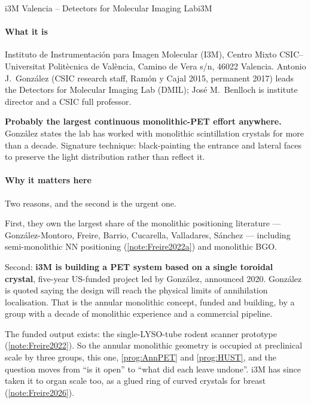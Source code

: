 \begin{programnote}{i3M Valencia -- Detectors for Molecular Imaging Lab}{i3M}
 
\paragraph{What it is}
Instituto de Instrumentación para Imagen Molecular (I3M), Centro Mixto
CSIC--Universitat Politècnica de València, Camino de Vera s/n, 46022 Valencia.
Antonio J.\ González (CSIC research staff, Ramón y Cajal 2015, permanent 2017)
leads the Detectors for Molecular Imaging Lab (DMIL); José M.\ Benlloch is
institute director and a CSIC full professor.
 
\textbf{Probably the largest continuous monolithic-PET effort anywhere.}
González states the lab has worked with monolithic scintillation crystals for
more than a decade. Signature technique: black-painting the entrance and lateral
faces to preserve the light distribution rather than reflect it.
 
\paragraph{Why it matters here}
Two reasons, and the second is the urgent one.
 
First, they own the largest share of the monolithic positioning literature ---
González-Montoro, Freire, Barrio, Cucarella, Valladares, Sánchez --- including
semi-monolithic NN positioning (\ref{note:Freire2022a}) and monolithic BGO.
 
Second: \textbf{i3M is building a PET system based on a single toroidal
crystal}, five-year US-funded project led by González, announced 2020. González
is quoted saying the design will reach the physical limits of annihilation
localisation. That is the annular monolithic concept, funded and building, by a
group with a decade of monolithic experience and a commercial pipeline.
 
The funded output exists: the single-LYSO-tube rodent scanner prototype
(\ref{note:Freire2022}). So the annular monolithic geometry is occupied at
preclinical scale by three groups, this one, \ref{prog:AnnPET} and
\ref{prog:HUST}, and the
question moves from ``is it open'' to ``what did each leave undone''.
i3M has since taken it to organ scale too, as a glued ring of curved
crystals for breast (\ref{note:Freire2026}).
 

\end{programnote}
